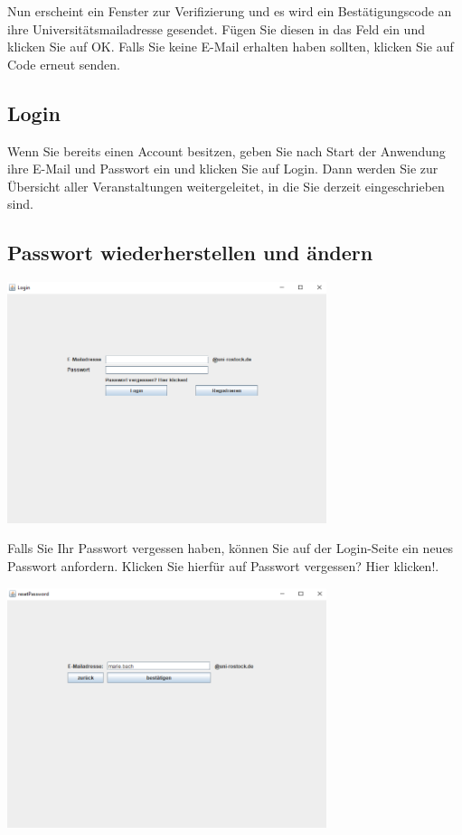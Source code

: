 \documentclass{Handbuch}
\begin{document}
Nun erscheint ein Fenster zur Verifizierung und es wird ein Bestätigungscode an ihre Universitätsmailadresse gesendet. Fügen Sie diesen in das Feld ein und klicken Sie auf \frqq OK\flqq.
Falls Sie keine E-Mail erhalten haben sollten, klicken Sie auf \frqq Code erneut senden\flqq. 

\subsection{Login}
Wenn Sie bereits einen Account besitzen, geben Sie nach Start der Anwendung ihre E-Mail und Passwort ein und klicken Sie auf \frqq Login\flqq. Dann werden Sie zur Übersicht aller Veranstaltungen weitergeleitet, in die Sie derzeit eingeschrieben sind. 

\subsection{Passwort wiederherstellen und ändern}
\begin{center}
	\includegraphics[width=0.7\textwidth]{img_DozentenGUI_06.png}
\end{center}
Falls Sie Ihr Passwort vergessen haben, können Sie auf der Login-Seite ein neues Passwort anfordern. Klicken Sie hierfür auf \frqq Passwort vergessen? Hier klicken!\flqq. 
\begin{center}
	\includegraphics[width=0.7\textwidth]{img_DozentenGUI_07.png}
\end{center}
\end{document}
